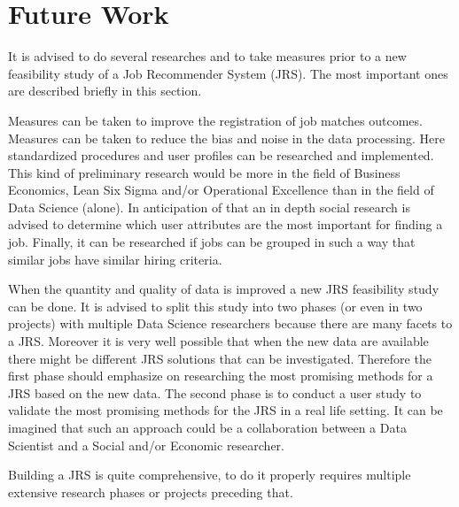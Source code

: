 \section{Future Work}
\label{sec:fut}

It is advised to do several researches and to take measures prior to a new feasibility study of a Job Recommender System (JRS).
The most important ones are described briefly in this section.

Measures can be taken to improve the registration of job matches outcomes.
Measures can be taken to reduce the bias and noise in the data processing.
Here standardized procedures and user profiles can be researched and implemented.
This kind of preliminary research would be more in the field of Business Economics, Lean Six Sigma and/or Operational Excellence than in the field of Data Science (alone).
In anticipation of that an in depth social research is advised to determine which user attributes are the most important for finding a job.
Finally, it can be researched if jobs can be grouped in such a way that similar jobs have similar hiring criteria.

When the quantity and quality of data is improved a new JRS feasibility study can be done.
It is advised to split this study into two phases (or even in two  projects) with multiple Data Science researchers because there are many facets to a JRS. 
Moreover it is very well possible that when the new data are available there might be different JRS solutions that can be investigated.
Therefore the first phase should emphasize on researching the most promising methods for a JRS based on the new data.
The second phase is to conduct a user study to validate the most promising methods for the JRS in a real life setting.
It can be imagined that such an approach could be a collaboration between a Data Scientist and a Social and/or Economic researcher.  

Building a JRS is quite comprehensive, to do it properly requires multiple extensive research phases or projects preceding that.
